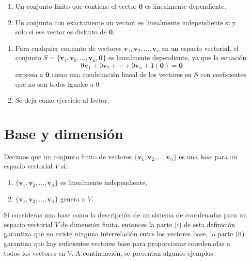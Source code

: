 \newpage

\begin{theorem}{}{}
    \begin{enumerate}[label=\roman*), topsep=6pt, itemsep=0pt]
        \item Un conjunto finito que contiene el vector $\mathbf{0}$ es linealmente dependiente.
        \item Un conjunto con exactamente un vector, es linealmente independiente si y solo si ese vector es distinto de $\mathbf{0}$.
    \end{enumerate}

    \tcblower
    \demostracion
    \begin{enumerate}[label=\roman*), topsep=6pt, itemsep=0pt]
        \item Para cualquier conjunto de vectores $\mathbf{v}_1, \mathbf{v}_2, \dots, \mathbf{v}_n$ en un espacio vectorial, el conjunto $S = \{\mathbf{v}_1, \mathbf{v}_2, \dots, \mathbf{v}_n, \mathbf{0}\}$ es linealmente dependiente, ya que la ecuación
        $$0\mathbf{v}_1 + 0\mathbf{v}_2 + \cdots + 0\mathbf{v}_n + 1(\mathbf{0}) = \mathbf{0}$$
        expresa a $\mathbf{0}$ como una combinación lineal de los vectores en $S$ con coeficientes que no son todos iguales a $0$.
        \item Se deja como ejercicio al lector.
    \end{enumerate}
\end{theorem}


\newpage

\section{Base y dimensión}

\begin{definicion}{}{}
    Decimos que un conjunto finito de vectores $\{ \mathbf{v}_1, \mathbf{v}_2, \dots, \mathbf{v}_n \}$ es una \emph{base} para un espacio vectorial $V$ si:
    \begin{enumerate}[label=\roman*), topsep=6pt, itemsep=0pt]
        \item $\{ \mathbf{v}_1, \mathbf{v}_2, \dots, \mathbf{v}_n \}$ es linealmente independiente,
        \item $\{ \mathbf{v}_1, \mathbf{v}_2, \dots, \mathbf{v}_n \}$ genera a $V$.
    \end{enumerate}
\end{definicion}

Si consideras una base como la descripción de un sistema de coordenadas para un espacio vectorial $V$ de dimensión finita, entonces la parte (i) de esta definición garantiza que no existe ninguna interrelación entre los vectores base, la parte (ii) garantiza que hay suficientes vectores base para proporcionar coordenadas a todos los vectores en $V$. A continuación, se presentan algunos ejemplos.

